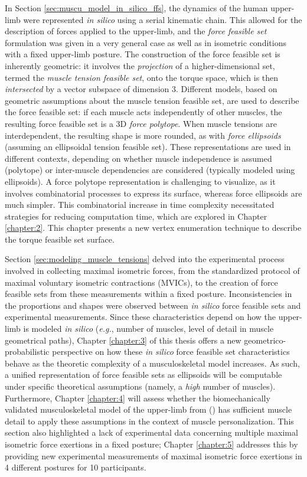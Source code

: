 In Section \ref{sec:muscu_model_in_silico_ffs}, the dynamics of the human upper-limb were represented \emph{in silico} using a serial kinematic chain. This allowed for the description of forces applied to the upper-limb, and the \emph{force feasible set} formulation was given in a very general case as well as in isometric conditions with a fixed upper-limb posture. The construction of the force feasible set is inherently geometric: it involves the \emph{projection} of a higher-dimensional set, termed the \emph{muscle tension feasible set}, onto the torque space, which is then \emph{intersected} by a vector subspace of dimension 3. Different models, based on geometric assumptions about the muscle tension feasible set, are used to describe the force feasible set: if each muscle acts independently of other muscles, the resulting force feasible set is a 3D \emph{force polytope}. When muscle tensions are interdependent, the resulting shape is more rounded, as with \emph{force ellipsoids} (assuming an ellipsoidal tension feasible set). These representations are used in different contexts, depending on whether muscle independence is assumed (polytope) or inter-muscle dependencies are considered (typically modeled using ellipsoids). A force polytope representation is challenging to visualize, as it involves combinatorial processes to express its surface, whereas force ellipsoids are much simpler. This combinatorial increase in time complexity necessitated strategies for reducing computation time, which are explored in Chapter \ref{chapter:2}. This chapter presents a new vertex enumeration technique to describe the torque feasible set surface.

Section \ref{sec:modeling_muscle_tensions} delved into the experimental process involved in collecting maximal isometric forces, from the standardized protocol of maximal voluntary isometric contractions (MVICs), to the creation of force feasible sets from these measurements within a fixed posture. Inconsistencies in the proportions and shapes were observed between \emph{in silico} force feasible sets and experimental measurements. Since these characteristics depend on how the upper-limb is modeled \emph{in silico} (\emph{e.g.}, number of muscles, level of detail in muscle geometrical paths), Chapter \ref{chapter:3} of this thesis offers a new geometrico-probabilistic perspective on how these \emph{in silico} force feasible set characteristics behave as the theoretic complexity of a musculoskeletal model increases. As such, a unified representation of force feasible sets as ellipsoids will be computable under specific theoretical assumptions (namely, a \emph{high} number of muscles). Furthermore, Chapter \ref{chapter:4} will assess whether the biomechanically validated musculoskeletal model of the upper-limb from (\cite{holzbaurModelUpperExtremity2005}) has sufficient muscle detail to apply these assumptions in the context of muscle personalization. This section also highlighted a lack of experimental data concerning multiple maximal isometric force exertions in a fixed posture; Chapter \ref{chapter:5} addresses this by providing new experimental measurements of maximal isometric force exertions in 4 different postures for 10 participants.

